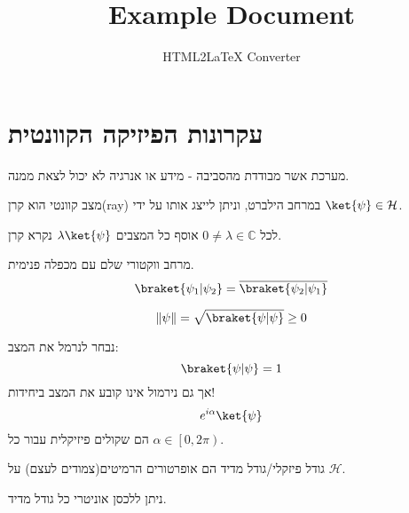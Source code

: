 \documentclass{tstextbook}
\begin{document}
\title{Example Document}
\author{HTML2LaTeX Converter}
\maketitle


\section{עקרונות הפיזיקה הקוונטית}

\begin{definition}
מערכת אשר מבודדת מהסביבה - מידע או אנרגיה לא יכול לצאת ממנה.

\end{definition}
\begin{definition}
מצב קוונטי הוא קרן(ray) במרחב הילברט, וניתן לייצג אותו על ידי \(\ket{\psi} \in \mathcal{H}\).

\end{definition}
\begin{definition}[קרן]
לכל \(0\neq \lambda \in \mathbb{C}\) אוסף כל המצבים \(\lambda \ket{ \psi}\) נקרא קרן.

\end{definition}
\begin{reminder}
מרחב ווקטורי שלם עם מכפלה פנימית.
$$\braket{ \psi_{1} | \psi_{2} } =\overline{\braket{ \psi_{2} | \psi_{1} } } $$

\end{reminder}
\begin{definition}
$$\left\lVert  \psi  \right\rVert =\sqrt{ \braket{ \psi | \psi }  }\geq 0 $$

\end{definition}
\begin{remark}
נבחר לנרמל את המצב:
$$\braket{ \psi | \psi } =1$$
אך גם נירמול אינו קובע את המצב ביחידות!
$$e^{ i\alpha }\ket{\psi} $$
הם שקולים פיזיקלית עבור כל \(\alpha \in \left[ 0,2\pi \right)\).

\end{remark}
\begin{definition}
גודל פיזקלי/גודל מדיד הם אופרטורים הרמיטים(צמודים לעצם) על \(\mathcal{H}\).

\end{definition}
\begin{corollary}
ניתן ללכסן אוניטרי כל גודל מדיד.

\end{corollary}
\end{document}
